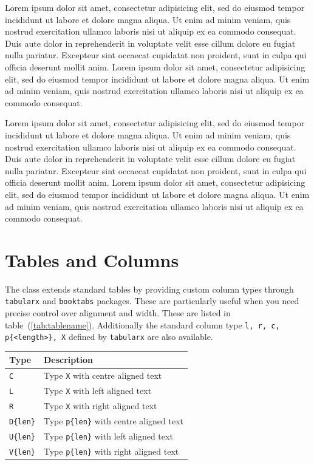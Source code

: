 \documentclass[11pt]{penrose}
\begin{document}
Lorem ipsum dolor sit amet, consectetur adipisicing elit, sed do eiusmod tempor incididunt ut labore et dolore magna aliqua. Ut enim ad minim veniam, quis nostrud exercitation ullamco laboris nisi ut aliquip ex ea commodo consequat. Duis aute dolor in reprehenderit in voluptate velit esse cillum dolore eu fugiat nulla pariatur. Excepteur sint occaecat cupidatat non proident, sunt in culpa qui officia deserunt mollit anim. Lorem ipsum dolor sit amet, consectetur adipisicing elit, sed do eiusmod tempor incididunt ut labore et dolore magna aliqua. Ut enim ad minim veniam, quis nostrud exercitation ullamco laboris nisi ut aliquip ex ea commodo consequat.

Lorem ipsum dolor sit amet, consectetur adipisicing elit, sed do eiusmod tempor incididunt ut labore et dolore magna aliqua. Ut enim ad minim veniam, quis nostrud exercitation ullamco laboris nisi ut aliquip ex ea commodo consequat. Duis aute dolor in reprehenderit in voluptate velit esse cillum dolore eu fugiat nulla pariatur. Excepteur sint occaecat cupidatat non proident, sunt in culpa qui officia deserunt mollit anim. Lorem ipsum dolor sit amet, consectetur adipisicing elit, sed do eiusmod tempor incididunt ut labore et dolore magna aliqua. Ut enim ad minim veniam, quis nostrud exercitation ullamco laboris nisi ut aliquip ex ea commodo consequat.

\section{Tables and Columns}
The class extends standard tables by providing custom column types through \verb|tabularx| and \verb|booktabs| packages. These are particularly useful when you need precise control over alignment and width. These are listed in table~(\ref{tab:tablename}). Additionally the standard column type \texttt{l, r, c, p\{<length>\}, X} defined by \verb|tabularx| are also available.

\begin{center}
  \label{tab:tablename}
  \begin{tabularx}{ 0.75\textwidth }{ D{25mm} X }
    \toprule
    Type & Description\\
    \midrule
    \texttt{C} & Type \texttt{X} with centre aligned text\\
    \texttt{L} & Type \texttt{X} with left aligned text\\
    \texttt{R} & Type \texttt{X} with right aligned text\\
    \texttt{D\{len\}} & Type \texttt{p\{len\}} with centre aligned text\\
    \texttt{U\{len\}} & Type \texttt{p\{len\}} with left aligned text\\
    \texttt{V\{len\}} & Type \texttt{p\{len\}} with right aligned text\\
    \bottomrule
  \end{tabularx}
\end{center}
\end{document}
